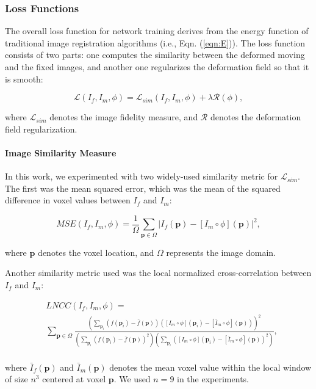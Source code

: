 \documentclass[times,twocolumn,final]{elsarticle}
\begin{document}
\subsubsection{Loss Functions}
The overall loss function for network training derives from the energy function of traditional image registration algorithms (i.e., Eqn. (\ref{eqn:E})). The loss function consists of two parts: one computes the similarity between the deformed moving and the fixed images, and another one regularizes the deformation field so that it is smooth:
\begin{linenomath}
\begin{equation}
\label{eqn:loss}
    \mathcal{L}(I_f, I_m, \phi)=\mathcal{L}_{sim}(I_f, I_m, \phi)+\lambda\mathcal{R}(\phi),
\end{equation}
\end{linenomath}
where $\mathcal{L}_{sim}$ denotes the image fidelity measure, and $\mathcal{R}$ denotes the deformation field regularization.
\paragraph{Image Similarity Measure}
In this work, we experimented with two widely-used similarity metric for $\mathcal{L}_{sim}$. The first was the mean squared error, which was the mean of the squared difference in voxel values between $I_f$ and $I_m$:
\begin{linenomath}
\begin{equation}
\label{eqn:MSE}
    MSE(I_f, I_m, \phi)=\frac{1}{\Omega}\sum_{\mathbf{p}\in\Omega}\vert I_f(\mathbf{p})-[I_m\circ\phi](\mathbf{p})\vert^2,
\end{equation}
\end{linenomath}
where $\mathbf{p}$ denotes the voxel location, and $\Omega$ represents the image domain.

Another similarity metric used was the local normalized cross-correlation between $I_f$ and $I_m$:
\begin{linenomath}
\begin{equation}
\label{eqn:lncc}
\begin{split}
    &LNCC(I_f, I_m, \phi)=\\
    &\sum_{\mathbf{p}\in\Omega}\frac{\left(\sum_{\mathbf{p}_i}(f(\mathbf{p}_i)-\bar{f}(\mathbf{p}))([I_m\circ\phi](\mathbf{p}_i)-[\bar{I}_m\circ\phi](\mathbf{p}))\right)^2}{\left(\sum_{\mathbf{p}_i}(f(\mathbf{p}_i)-\bar{f}(\mathbf{p}))^2\right)\left(\sum_{\mathbf{p}_i}([I_m\circ\phi](\mathbf{p}_i)-[\bar{I}_m\circ\phi](\mathbf{p}))^2\right)},\\
\end{split}
\end{equation}
\end{linenomath}
where $\bar{I}_f(\mathbf{p})$ and $\bar{I}_m(\mathbf{p})$ denotes the mean voxel value within the local window of size $n^3$ centered at voxel $\mathbf{p}$. We used $n=9$ in the experiments.  
\end{document}
